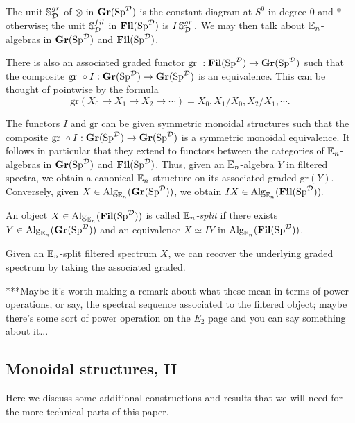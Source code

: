 The unit $\S0^{gr}_{\D}$ of $\otimes$ in $\Gr(\Sp^{\D})$ is the constant diagram at $S^0$ in degree 0 and $*$ otherwise; the unit $\S0^{fil}_{\D}$ in $\Fil(\Sp^{\D})$ is $I\S0^{gr}_{\D}.$  We may then talk about $\E_n$-algebras in $\Gr(\Sp^{\D})$ and $\Fil(\Sp^{\D})$.  



There is also an associated graded functor $\text{gr }: \Fil(\Sp^{\D}) \to \Gr(\Sp^{\D})$ such that the composite $\text{gr }\circ I : \Gr(\Sp^{\D}) \to \Gr(\Sp^{\D})$ is an equivalence.   This can be thought of pointwise by the formula $$\text{gr}(X_0\to X_1\to X_2\to \cdots) = X_0, X_1/X_0, X_2/X_1, \cdots.$$




The functors $I$ and $\text{gr}$ can be given symmetric monoidal structures such that the composite $\text{gr }\circ I : \Gr(\Sp^{\D}) \to \Gr(\Sp^{\D})$ is a symmetric monoidal equivalence.  It follows in particular that they extend to functors between the categories of $\E_n$-algebras in $\Gr(\Sp^{\D})$ and $\Fil(\Sp^{\D})$.  Thus, given an $\E_n$-algebra $Y$ in filtered spectra, we obtain a canonical $\E_n$ structure on its associated graded $\text{gr}(Y).$  Conversely, given $X\in \Alg_{\E_n}(\Gr(\Sp^{\D}))$, we obtain $IX\in \Alg_{\E_n}(\Fil(\Sp^{\D})).$  

\begin{dfn}
An object $X\in \Alg_{\E_n}(\Fil(\Sp^{\D}))$ is called \emph{$\E_n$-split} if there exists $Y\in \Alg_{\E_n}(\Gr(\Sp^{\D}))$ and an equivalence $X \simeq IY$ in $\Alg_{\E_n}(\Fil(\Sp^{\D}))$.  
\end{dfn}

Given an $\E_n$-split filtered spectrum $X$, we can recover the underlying graded spectrum by taking the associated graded. 

***Maybe it's worth making a remark about what these mean in terms of power operations, or say, the spectral sequence associated to the filtered object; maybe there's some sort of power operation on the $E_2$ page and you can say something about it...


\subsection{Monoidal structures, II}\label{sect:monoidal2}
Here we discuss some additional constructions and results that we will need for the more technical parts of this paper.  %

